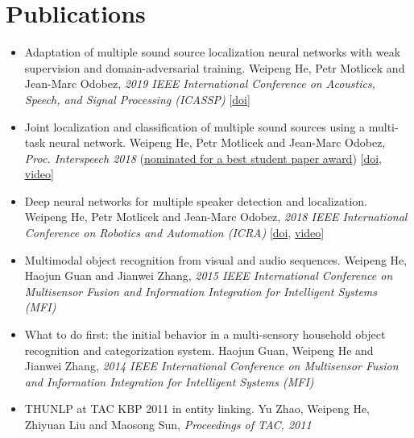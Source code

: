 \documentclass[a4paper,9pt]{extarticle} %
\begin{document}
\section{Publications}
\begin{itemize}
  \item Adaptation of multiple sound source localization neural networks with weak supervision and domain-adversarial training.
        Weipeng He, Petr Motlicek and Jean-Marc Odobez,
        \textit{2019 IEEE International Conference on Acoustics, Speech, and Signal Processing (ICASSP)}
        [\href{https://doi.org/10.1109/ICASSP.2019.8682655}{doi}]

  \item Joint localization and classification of multiple sound sources using a multi-task neural network.
        Weipeng He, Petr Motlicek and Jean-Marc Odobez,
        \textit{Proc. Interspeech 2018}
        (\ul{nominated for a best student paper award})
        [\href{http://doi.org/10.21437/Interspeech.2018-1269}{doi}, \href{https://www.youtube.com/watch?v=O7bQvg03RTc}{video}]

  \item Deep neural networks for multiple speaker detection and localization.
        Weipeng He, Petr Motlicek and Jean-Marc Odobez,
        \textit{2018 IEEE International Conference on Robotics and Automation (ICRA)}
        [\href{http://doi.org/10.1109/ICRA.2018.8461267}{doi}, \href{https://www.youtube.com/watch?v=_4EwuVlE_pU}{video}]

  \item Multimodal object recognition from visual and audio sequences.
        Weipeng He, Haojun Guan and Jianwei Zhang,
        \textit{2015 IEEE International Conference on Multisensor Fusion and Information Integration for Intelligent Systems (MFI)}

  \item What to do first: the initial behavior in a multi-sensory household object recognition and categorization system.
        Haojun Guan, Weipeng He and Jianwei Zhang,
        \textit{2014 IEEE International Conference on Multisensor Fusion and Information Integration for Intelligent Systems (MFI)}

  \item THUNLP at TAC KBP 2011 in entity linking.
        Yu Zhao, Weipeng He, Zhiyuan Liu and Maosong Sun,
        \textit{Proceedings of TAC, 2011}
\end{itemize}

\end{document}
